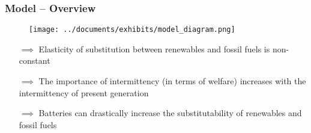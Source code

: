 \documentclass[aspectratio=169]{beamer}
\begin{document}
\begin{frame}
\frametitle{Model -- Overview}


\begin{figure}
	\texttt{[image: ../documents/exhibits/model\_diagram.png]} 
\end{figure}

\vspace{-0.8em}

\begin{itemize}
	\setlength\itemsep{0.2em}
	\item[$\implies$] Elasticity of substitution between renewables and fossil fuels is non-constant
	\item[$\implies$] The importance of intermittency (in terms of welfare) increases with the intermittency of present generation
	\item[$\implies$] Batteries can drastically increase the substitutability of renewables and fossil fuels
\end{itemize}

\end{frame}
\end{document}

